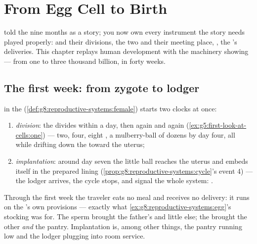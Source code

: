 \chapter{From Egg Cell to Birth}\label{ch:g8:from-egg-to-birth}

 told the nine months as a
story; you now own every instrument the story needs played
properly:  and their divisions, the two  and
their meeting place, , the 's deliveries. This
chapter replays human development with the machinery showing
--- from one  to three thousand billion, in forty weeks.

\section{The first week: from zygote to lodger}

\begin{proposition}\label{prop:g8:from-egg-to-birth:firstweek}
 in the 
(\cref{def:g8:reproductive-systems:female}) starts two
clocks at once:
\begin{enumerate}
  \item \emph{division}: the  divides within a day,
        then again and again
        (\cref{ex:g5:first-look-at-cells:one}) --- two,
        four, eight , a mulberry-ball of dozens by
        day four, all while drifting down the 
        toward the uterus;
  \item \emph{implantation}: around day seven the little
        ball reaches the uterus and embeds itself in the
        prepared lining
        (\cref{prop:g8:reproductive-systems:cycle}'s event
        4) --- the lodger arrives, the cycle stops, and
         signal the whole system: .
\end{enumerate}
\end{proposition}
\admitted

\begin{example}\label{ex:g8:from-egg-to-birth:provisions}
Through the first week the traveler eats no meal and
receives no delivery: it runs on the 's own
provisions --- exactly what
\cref{ex:g8:reproductive-systems:egg}'s stocking was for.
The sperm brought the father's  and little else;
the  brought the other  \emph{and} the pantry.
Implantation is, among other things, the pantry running
low and the lodger plugging into room service.
\end{example}

